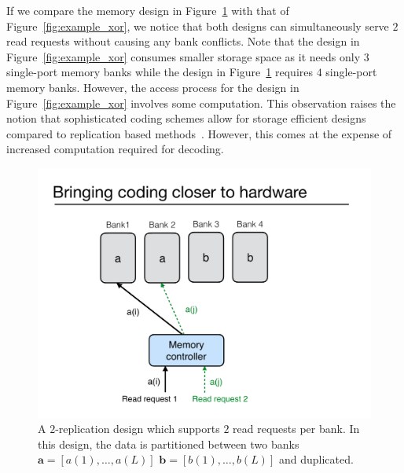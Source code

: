 \begin{remark}
\label{rem:read_only}
If we compare the memory design in Figure~\ref{fig:read_replication} with that of Figure~\ref{fig:example_xor}, we notice that both designs can simultaneously serve $2$ read requests without causing any bank conflicts. Note that the design in Figure~\ref{fig:example_xor} consumes smaller storage space as it needs only $3$ single-port memory banks while the design in  Figure~\ref{fig:read_replication} requires $4$ single-port memory banks. However, the access process for the design in Figure~\ref{fig:example_xor} involves some computation. {\color{red}This observation raises the notion that sophisticated coding schemes allow for storage efficient designs compared to replication based methods~\cite{MacSlo}. However, this comes at the expense of increased computation required for decoding.}
\end{remark}

\begin{figure}[t!]
\centering
\includegraphics[width=0.425\linewidth]{fig/read-replication.pdf}
\caption{A $2$-replication design which supports $2$ read requests per bank. In this design, the data is partitioned between two banks $\mathbf{a} = [a(1),\ldots, a(L)]$ $\mathbf{b} = [b(1),\ldots, b(L)]$ and duplicated.}
\label{fig:read_replication}
\end{figure}

